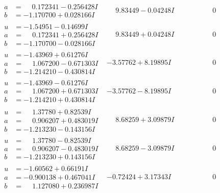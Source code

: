 \documentclass[1p]{elsarticle_modified}
\theoremstyle{definition}
\begin{document}
$$\begin{array}{c|c|c}
\begin{aligned}
a &= \phantom{-}0.172341 - 0.256428 I \\
b &= -1.170700 + 0.028166 I\end{aligned}
 & \phantom{-}9.83449 - 0.04248 I & \phantom{-0.000000 } 0 \\ \hline\begin{aligned}
u &= -1.54951 - 0.14699 I \\
a &= \phantom{-}0.172341 + 0.256428 I \\
b &= -1.170700 - 0.028166 I\end{aligned}
 & \phantom{-}9.83449 + 0.04248 I & \phantom{-0.000000 } 0 \\ \hline\begin{aligned}
u &= -1.43969 + 0.61276 I \\
a &= \phantom{-}1.067200 - 0.671303 I \\
b &= -1.214210 - 0.430814 I\end{aligned}
 & -3.57762 + 8.19895 I & \phantom{-0.000000 } 0 \\ \hline\begin{aligned}
u &= -1.43969 - 0.61276 I \\
a &= \phantom{-}1.067200 + 0.671303 I \\
b &= -1.214210 + 0.430814 I\end{aligned}
 & -3.57762 - 8.19895 I & \phantom{-0.000000 } 0 \\ \hline\begin{aligned}
u &= \phantom{-}1.37780 + 0.82539 I \\
a &= \phantom{-}0.906207 + 0.483019 I \\
b &= -1.213230 - 0.143156 I\end{aligned}
 & \phantom{-}8.68259 + 3.09879 I & \phantom{-0.000000 } 0 \\ \hline\begin{aligned}
u &= \phantom{-}1.37780 - 0.82539 I \\
a &= \phantom{-}0.906207 - 0.483019 I \\
b &= -1.213230 + 0.143156 I\end{aligned}
 & \phantom{-}8.68259 - 3.09879 I & \phantom{-0.000000 } 0 \\ \hline\begin{aligned}
u &= -1.60562 + 0.66191 I \\
a &= -0.900138 + 0.467041 I \\
b &= \phantom{-}1.127080 + 0.236987 I\end{aligned}
 & -0.72424 + 3.17343 I & \phantom{-0.000000 } 0 \\ \hline\begin{aligned}

\end{aligned}
\end{array}$$
\end{document}

